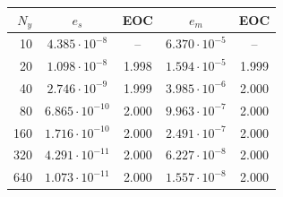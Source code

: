 \begin{tabular}{rcccc}
\toprule
$N_y$ & $e_s$ & EOC & $e_m$ & EOC \\
\midrule
10 & $4.385 \cdot 10^{-8}$ & -- & $6.370 \cdot 10^{-5}$ & -- \\
20 & $1.098 \cdot 10^{-8}$ & 1.998 & $1.594 \cdot 10^{-5}$ & 1.999 \\
40 & $2.746 \cdot 10^{-9}$ & 1.999 & $3.985 \cdot 10^{-6}$ & 2.000 \\
80 & $6.865 \cdot 10^{-10}$ & 2.000 & $9.963 \cdot 10^{-7}$ & 2.000 \\
160 & $1.716 \cdot 10^{-10}$ & 2.000 & $2.491 \cdot 10^{-7}$ & 2.000 \\
320 & $4.291 \cdot 10^{-11}$ & 2.000 & $6.227 \cdot 10^{-8}$ & 2.000 \\
640 & $1.073 \cdot 10^{-11}$ & 2.000 & $1.557 \cdot 10^{-8}$ & 2.000 \\
\bottomrule
\end{tabular}
